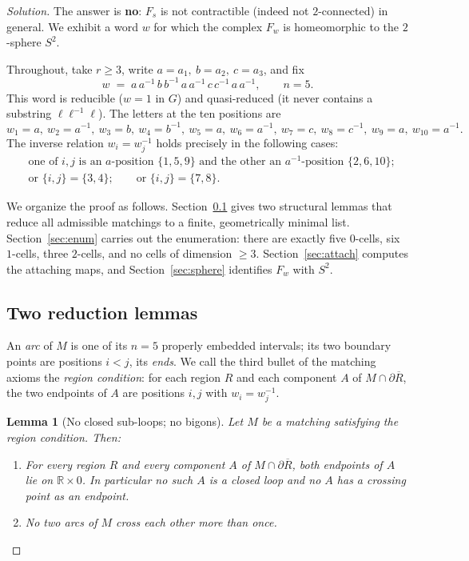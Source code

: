 \documentclass{amsart}
\newtheorem{lemma}{Lemma}
\theoremstyle{definition}
\newcommand{\RR}{\mathbb{R}}
\newcommand{\bdy}{\partial}
\begin{document}
\begin{proof}[Solution]
The answer is \textbf{no}: $F_s$ is not contractible (indeed not $2$-connected) in general.
We exhibit a word $w$ for which the complex $F_w$ is homeomorphic to the $2$-sphere $S^2$.

Throughout, take $r\ge 3$, write $a=a_1,\ b=a_2,\ c=a_3$, and fix
\[
  w \;=\; a\,a^{-1}\,b\,b^{-1}\,a\,a^{-1}\,c\,c^{-1}\,a\,a^{-1},
  \qquad n=5 .
\]
This word is reducible ($w=1$ in $G$) and quasi-reduced (it never contains a substring
$\ell\ell^{-1}\ell$). The letters at the ten positions are
\[
  w_1=a,\ w_2=a^{-1},\ w_3=b,\ w_4=b^{-1},\ w_5=a,\ w_6=a^{-1},
  \ w_7=c,\ w_8=c^{-1},\ w_9=a,\ w_{10}=a^{-1}.
\]
The inverse relation $w_i=w_j^{-1}$ holds precisely in the following cases:
\begin{equation}\label{eq:inv}
\begin{aligned}
&\text{one of }i,j\text{ is an }a\text{-position }\{1,5,9\}\text{ and the other an }
 a^{-1}\text{-position }\{2,6,10\};\\
&\text{or }\{i,j\}=\{3,4\};\qquad\text{or }\{i,j\}=\{7,8\}.
\end{aligned}
\end{equation}

We organize the proof as follows.
Section~\ref{sec:bigon} gives two structural lemmas that reduce all admissible matchings to a
finite, geometrically minimal list.
Section~\ref{sec:enum} carries out the enumeration: there are exactly five $0$-cells,
six $1$-cells, three $2$-cells, and no cells of dimension $\ge 3$.
Section~\ref{sec:attach} computes the attaching maps, and Section~\ref{sec:sphere} identifies
$F_w$ with $S^2$.

\subsection{Two reduction lemmas}\label{sec:bigon}

An \emph{arc} of $M$ is one of its $n=5$ properly embedded intervals; its two boundary points
are positions $i<j$, its \emph{ends}. We call the third bullet of the matching axioms the
\emph{region condition}: for each region $R$ and each component $A$ of $M\cap\bdy\overline R$,
the two endpoints of $A$ are positions $i,j$ with $w_i=w_j^{-1}$.

\begin{lemma}[No closed sub-loops; no bigons]\label{lem:bigon}
Let $M$ be a matching satisfying the region condition. Then:
\begin{enumerate}
\item[(i)] For every region $R$ and every component $A$ of $M\cap\bdy\overline R$, both
endpoints of $A$ lie on $\RR\times0$. In particular no such $A$ is a closed loop and no $A$
has a crossing point as an endpoint.
\item[(ii)] No two arcs of $M$ cross each other more than once.
\end{enumerate}
\end{lemma}


\end{proof}
\end{document}
